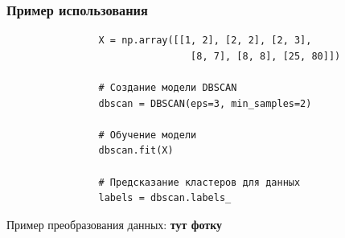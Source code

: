 			
		\subsubsection{Пример использования}
			\begin{verbatim}
				X = np.array([[1, 2], [2, 2], [2, 3],
              					[8, 7], [8, 8], [25, 80]])

				# Создание модели DBSCAN
				dbscan = DBSCAN(eps=3, min_samples=2)

				# Обучение модели
				dbscan.fit(X)

				# Предсказание кластеров для данных
				labels = dbscan.labels_
			\end{verbatim}
			
			
			Пример преобразования данных:
				\textbf{тут фотку}
	
	






